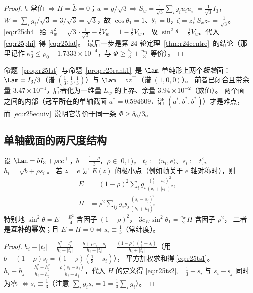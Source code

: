 \begin{proof}
$h$ 常值 $\Rightarrow H=\widetilde E=0$；$w=g/\sqrt3\Rightarrow S_w=\frac1{\sqrt3}\sum_ig_iu_iu_i^\top=\frac1{\sqrt3}I_3$，
$W=\sum_ig_i/\sqrt3=3/\sqrt3=\sqrt3$，故 $\cos\theta_1=1$、$\theta_1=0$，$\zeta=z_*^\top S_wz_*=\frac1{\sqrt3}$。
\eqref{eq:r25ch4}~给 $A_w^2=\sqrt3\cdot\frac1{\sqrt3}-\frac12V_w=1-\frac12V_w$，
故 $\sin^2\theta=\frac12V_w$。代入 \eqref{eq:r25phi}~得 \eqref{eq:r25lat}。
最后一步是第 24 轮定理~\ref{thm:r24centre}~的结论（那里记作
$\kappa_3^c\le\rho_0-1.7333\times10^{-4}$，与 $\Phi\ge\frac{\delta_0}3+\frac{m_1}3$ 等价）。
\end{proof}

\begin{remark}\label{rem:r25lat2}
命题~\ref{prop:r25lat}~与命题~\ref{prop:r25rank1}~是 $\Lam$-单纯形上两个\emph{极端}面：
$\Lam=I_3/3$（谱 $(\frac13,\frac13,\frac13)$）与 $\Lam=zz^\top$（谱 $(1,0,0)$）。
前者已闭合且带余量 $3.47\times10^{-4}$，后者化为一维量 $L_w$ 的上界、余量 $3.94\times10^{-2}$（数值）。
两个面之间的内部（冠军所在的单轴截面 $a^*=0.594609$，谱 $(a^*,b^*,b^*)$）才是难点，
而 \eqref{eq:r25equiv}~说明它等价于同一条 $\Phi\ge\delta_0/3$。
\end{remark}

\subsection{单轴截面的两尺度结构}\label{sec:r25:twoscale}

\begin{proposition}[两尺度精确公式]\label{prop:r25twoscale}
设 $\Lam=bI_3+\rho ee^\top$，$b=\frac{1-\rho}3$，$\rho\in[0,1)$，
$t_i:=\langle u_i,e\rangle$、$s_i:=t_i^2$、$h_i=\sqrt{b+\rho s_i}$。
若 $z=e$ 是 $E(z)$ 的极小点（例如帧关于 $e$ 轴对称时），则
\begin{align}
E&=(1-\rho)^2\sum_ig_i\frac{(\frac13-s_i)^2}{(h_i+|t_i|)^2},\label{eq:r25ts1}\\
H&=\rho^2\sum_{ij}g_ig_j\frac{(s_i-s_j)^2}{(h_i+h_j)^2}.\label{eq:r25ts2}
\end{align}
特别地 $\sin^2\theta=E-\frac{E^2}4$ 含因子 $(1-\rho)^2$，
$3c_W\sin^2\theta_1=\frac{c_W}2H$ 含因子 $\rho^2$，
二者是\textbf{互补的幂次}；且 $E=H=0\iff s_i\equiv\frac13$（常纬度）。
\end{proposition}

\begin{proof}
$h_i-|t_i|=\frac{h_i^2-t_i^2}{h_i+|t_i|}=\frac{b+\rho s_i-s_i}{h_i+|t_i|}
=\frac{(1-\rho)(\frac13-s_i)}{h_i+|t_i|}$（用 $b-(1-\rho)s_i=(1-\rho)(\frac13-s_i)$），
平方加权求和得 \eqref{eq:r25ts1}。
$h_i-h_j=\frac{h_i^2-h_j^2}{h_i+h_j}=\frac{\rho(s_i-s_j)}{h_i+h_j}$，代入 $H$ 的定义得 \eqref{eq:r25ts2}。
$\frac13-s_i$ 与 $s_i-s_j$ 同时为零 $\iff s_i\equiv\frac13$（注意 $\sum_ig_is_i=1=\frac13\sum_ig_i$）。
\end{proof}

